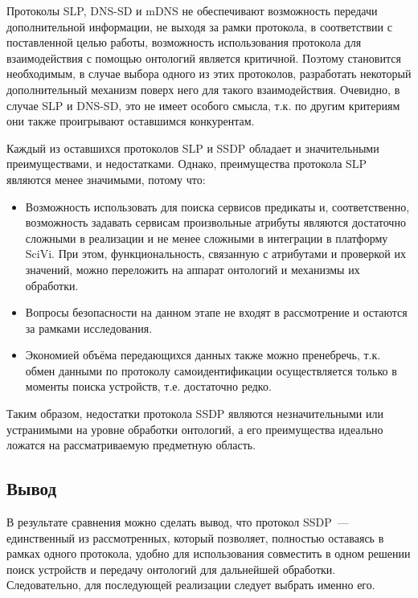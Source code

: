 Протоколы SLP, DNS-SD и mDNS не обеспечивают возможность передачи дополнительной информации, не выходя за рамки протокола, в соответствии с поставленной целью работы, возможность использования протокола для взаимодействия с помощью онтологий является критичной.
Поэтому становится необходимым, в случае выбора одного из этих протоколов, разработать некоторый дополнительный механизм поверх него для такого взаимодействия.
Очевидно, в случае SLP и DNS-SD, это не имеет особого смысла, т.к.
по другим критериям они также проигрывают оставшимся конкурентам.

Каждый из оставшихся протоколов SLP и SSDP обладает и значительными преимуществами, и недостатками.
Однако, преимущества протокола SLP являются менее значимыми, потому что:
\begin{itemize}
	\item Возможность использовать для поиска сервисов предикаты и, соответственно, возможность задавать сервисам произвольные атрибуты являются достаточно сложными в реализации и не менее сложными в интеграции в платформу SciVi.
	При этом, функциональность, связанную с атрибутами и проверкой их значений, можно переложить на аппарат онтологий и механизмы их обработки.
	\item Вопросы безопасности на данном этапе не входят в рассмотрение и остаются за рамками исследования.
	\item Экономией объёма передающихся данных также можно пренебречь, т.к. обмен данными по протоколу самоидентификации осуществляется только в моменты поиска устройств, т.е. достаточно редко.
\end{itemize}

Таким образом, недостатки протокола SSDP являются незначительными или устранимыми на уровне обработки онтологий, а его преимущества идеально ложатся на рассматриваемую предметную область.

\subsection {Вывод}

В результате сравнения можно сделать вывод, что протокол SSDP~--- единственный из рассмотренных, который позволяет, полностью оставаясь в рамках одного протокола, удобно для использования совместить в одном решении поиск устройств и передачу онтологий для дальнейшей обработки. 
Следовательно, для последующей реализации следует выбрать именно его.
